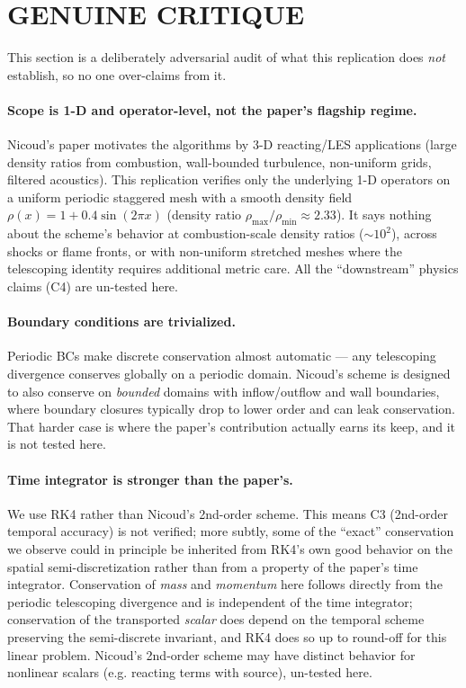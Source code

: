 \documentclass[11pt]{article}
\begin{document}
\section{GENUINE CRITIQUE}
This section is a deliberately adversarial audit of what this replication
does \emph{not} establish, so no one over-claims from it.

\paragraph{Scope is 1-D and operator-level, not the paper's flagship regime.}
Nicoud's paper motivates the algorithms by 3-D reacting/LES applications
(large density ratios from combustion, wall-bounded turbulence, non-uniform
grids, filtered acoustics). This replication verifies only the underlying
1-D operators on a uniform periodic staggered mesh with a smooth density
field \(\rho(x)=1+0.4\sin(2\pi x)\) (density ratio \(\rho_\text{max}/\rho_\text{min}\approx 2.33\)).
It says nothing about the scheme's behavior at combustion-scale density
ratios (\(\sim 10^2\)), across shocks or flame fronts, or with non-uniform
stretched meshes where the telescoping identity requires additional metric
care. All the ``downstream'' physics claims (C4) are un-tested here.

\paragraph{Boundary conditions are trivialized.}
Periodic BCs make discrete conservation almost automatic --- any telescoping
divergence conserves globally on a periodic domain. Nicoud's scheme is
designed to also conserve on \emph{bounded} domains with inflow/outflow and
wall boundaries, where boundary closures typically drop to lower order and
can leak conservation. That harder case is where the paper's contribution
actually earns its keep, and it is not tested here.

\paragraph{Time integrator is stronger than the paper's.}
We use RK4 rather than Nicoud's 2nd-order scheme. This means C3 (2nd-order
temporal accuracy) is not verified; more subtly, some of the ``exact''
conservation we observe could in principle be inherited from RK4's own good
behavior on the spatial semi-discretization rather than from a property of
the paper's time integrator. Conservation of \emph{mass} and
\emph{momentum} here follows directly from the periodic telescoping
divergence and is independent of the time integrator; conservation of the
transported \emph{scalar} does depend on the temporal scheme preserving the
semi-discrete invariant, and RK4 does so up to round-off for this linear
problem. Nicoud's 2nd-order scheme may have distinct behavior for nonlinear
scalars (e.g. reacting terms with source), un-tested here.
\end{document}
